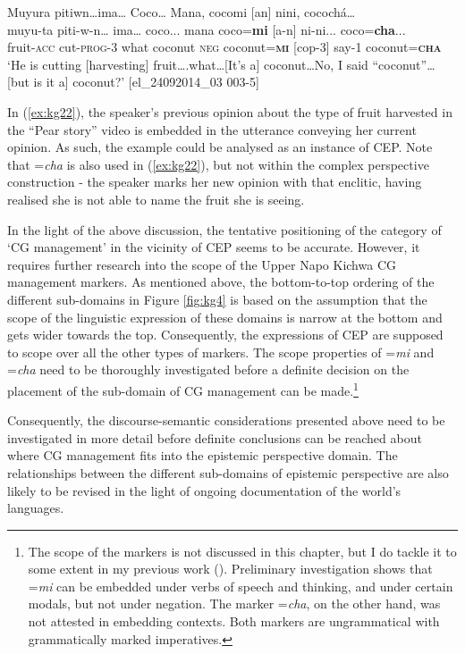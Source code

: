 \documentclass[output=paper]{langscibook}
\begin{document}
\begin{exe}
	\ex \label{ex:kg22}
	\glll Muyura pitiwn…ima… Coco… Mana, cocomi [an] nini, cocochá…\\
	muyu-ta 	piti-w-n… ima… coco... mana coco=\textbf{mi} [a-n] ni-ni...   coco=\textbf{cha}...\\
	fruit-\textsc{acc} 	cut-\textsc{prog}-3 what coconut \textsc{neg} coconut=\textbf{\textsc{mi}} [cop-3] say-1 coconut=\textbf{\textsc{cha}}\\
	\trans ‘He is cutting [harvesting] fruit….what…[It’s a] coconut…No, I said “coconut”… [but is it a] coconut?’ [el\_24092014\_03   003-5]
\end{exe}

In (\ref{ex:kg22}), the speaker’s previous opinion about the type of fruit harvested in the “Pear story” video is embedded in the utterance conveying her current opinion. As such, the example could be analysed as an instance of CEP. Note that =\textit{cha} is also used in (\ref{ex:kg22}), but not within the complex perspective construction - the speaker marks her new opinion with that enclitic, having realised she is not able to name the fruit she is seeing.

In the light of the above discussion, the tentative positioning of the category of ‘CG management’ in the vicinity of CEP seems to be accurate. However, it requires further research into the scope of the Upper Napo Kichwa CG management markers. As mentioned above, the bottom-to-top ordering of the different sub-domains in Figure \ref{fig:kg4} is based on the assumption that the scope of the linguistic expression of these domains is narrow at the bottom and gets wider towards the top. Consequently, the expressions of CEP are supposed to scope over all the other types of markers. The scope properties of =\textit{mi} and =\textit{cha} need to be thoroughly investigated before a definite decision on the placement of the sub-domain of CG management can be made.\footnote{The scope of the markers is not discussed in this chapter, but I do tackle it to some extent in my previous work (\citealt[ch.5]{Grzech2016a}). Preliminary investigation shows that =\textit{mi} can be embedded under verbs of speech and thinking, and under certain modals, but not under negation. The marker =\textit{cha}, on the other hand, was not attested in embedding contexts. Both markers are ungrammatical with grammatically marked imperatives.}

Consequently, the discourse-semantic considerations presented above need to be investigated in more detail before definite conclusions can be reached about where CG management fits into the epistemic perspective domain. The relationships between the different sub-domains of epistemic perspective are also likely to be revised in the light of ongoing documentation of the world’s languages.
\end{document}
